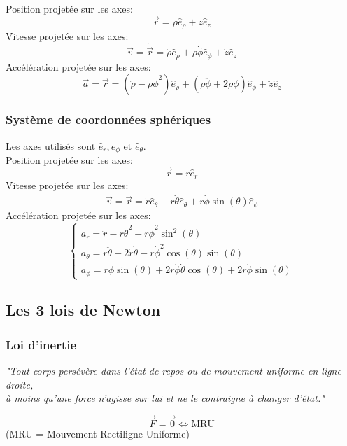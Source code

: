 \documentclass{article}
\numberwithin{equation}{section}
\begin{document}
Position projetée sur les axes:
\begin{equation}
	\boxed{\vec r = \rho \hat e_\rho + z \hat e_z}
\end{equation}
Vitesse projetée sur les axes:
\begin{equation}
	\boxed{\vec v = \dot{\vec{r}} = \dot \rho \hat e_\rho + \rho \dot \phi \hat e_\phi + \dot z \hat e_z}
\end{equation}
Accélération projetée sur les axes:
\begin{equation}
	\boxed{\vec a = \ddot{\vec{r}}	= \left (\ddot \rho - \rho \dot \phi^2 \right ) \hat e_\rho
					 						+ \left (\rho \ddot \phi + 2 \dot \rho \dot \phi \right ) \hat e_\phi
					 						+ \ddot z \hat e_z}
\end{equation}

\subsubsection{Système de coordonnées sphériques}
Les axes utilisés sont \(\hat e_r, \hat e_\phi\) et \(\hat e_\theta\). \\
Position projetée sur les axes:
\begin{equation}
	\boxed{\vec r = r \hat e_r}
\end{equation}
Vitesse projetée sur les axes:
\begin{equation}
	\boxed{\vec v = \dot{\vec{r}} = \dot r \hat e_\theta + r \dot \theta \hat e_\theta + r \dot \phi \sin(\theta) \hat e_\phi}
\end{equation}
Accélération projetée sur les axes:
\begin{equation}
	\boxed{\begin{cases}
	a_r 		= \ddot r - r \dot \theta^2 - r \dot \phi^2 \sin^2(\theta) \\
	a_\theta	= r \ddot \theta + 2 \dot r \dot \theta - r \dot \phi^2 \cos(\theta)\sin(\theta) \\
	a_\phi		= r \ddot \phi \sin(\theta) + 2r \dot \phi \dot \theta \cos(\theta) + 2 \dot r \dot \phi \sin(\theta)
	\end{cases}}
\end{equation}

\subsection{Les 3 lois de Newton}

\subsubsection{Loi d'inertie}
\begin{center}
	\emph{"Tout corps persévère dans l'état de repos ou de mouvement uniforme en ligne droite, \\
	 à moins qu'une force n'agisse sur lui et ne le contraigne à changer d'état."}
\end{center}
\begin{equation}
	\boxed{\vec F = \vec 0 \Leftrightarrow \text{MRU}}
\end{equation}
(MRU = Mouvement Rectiligne Uniforme)
\end{document}
